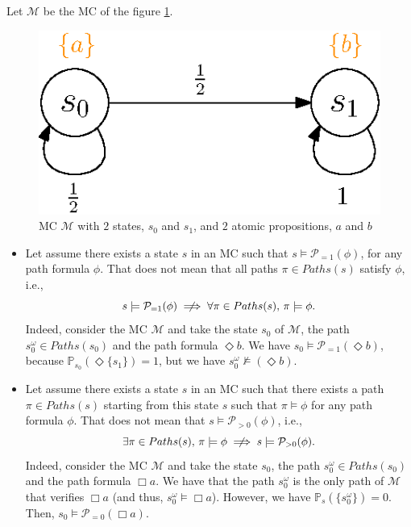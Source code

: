 \begin{remark}
Let $\mathcal{M}$ be the MC of the figure \ref{pctlctl}.
\begin{figure}[h]
  \centering
  \includegraphics[width=0.25\linewidth]{resources/PCTL_CTL}
  \captionsetup{justification=centering}
  \caption{MC $\mathcal{M}$ with $2$ states, $s_0$ and $s_1$, and $2$ atomic propositions, $a$ and $b$}\label{pctlctl}
\end{figure}
\begin{itemize}
  \item Let assume there exists a state $s$ in an MC such that $s \models \mathcal{P}_{=1}(\phi)$, for any path formula $\phi$. That does not mean that all paths $\pi \in Paths(s)$ satisfy $\phi$, i.e.,
  \[s \models \mathcal{P}_{=1}(\phi) \centernot\implies \forall \pi \in Paths(s), \, \pi \models \phi.\]
  Indeed, consider the MC $\mathcal{M}$ and take the state $s_0$ of $\mathcal{M}$, the path $s_0^\omega \in Paths(s_0)$ and the path formula $\Diamond b$. We have $s_0 \models \mathcal{P}_{=1}(\Diamond b)$, because $\mathbb{P}_{s_0}(\Diamond \{s_1\})=1$, but we have $s_0^\omega \not \models (\Diamond b)$.

  \item Let assume there exists a state $s$ in an MC such that there exists a path $\pi \in Paths(s)$ starting from this state $s$ such that $\pi \models \phi$ for any path formula $\phi$.
  That does not mean that $s \models \mathcal{P}_{> 0}(\phi)$, i.e.,
  \[
    \exists \pi \in Paths(s),\, \pi \models \phi \centernot\implies s \models \mathcal{P}_{>0} (\phi).
  \]
  Indeed, consider the MC $\mathcal{M}$ and take the state $s_0$, the path $s_0^\omega \in Paths(s_0)$ and the path formula $\Box a$. We have that the path $s_0^\omega$ is the only path of $\mathcal{M}$ that verifies $\Box a$ (and thus, $s_0^\omega \models \Box a$).
  However, we have $\mathbb{P}_s(\{s_0^\omega\})=0$. Then, $s_0 \models \mathcal{P}_{=0} (\Box a)$.
\end{itemize}
\end{remark}

